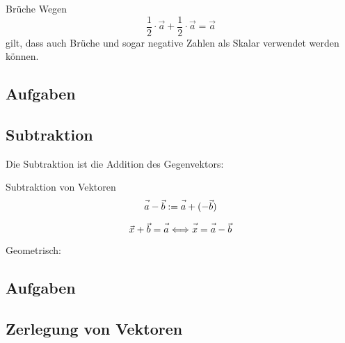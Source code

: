 \begin{beispiel}{Brüche}{}
  Wegen
  $$\frac12\cdot{}\vec{a} + \frac12\cdot{}\vec{a} = \vec{a}$$
  gilt, dass auch Brüche und sogar  negative Zahlen als Skalar
  verwendet werden können.
\end{beispiel}
\newpage

\subsection*{Aufgaben}
\newpage

\subsection{Subtraktion}

Die Subtraktion ist die Addition des Gegenvektors:

\begin{definition}{Subtraktion von Vektoren}{}
  $$\vec{a\vphantom{b}} - \vec{b} := \vec{a\vphantom{b}} + (-\vec{b})$$
\end{definition}

\begin{bemerkung}{}{}
  $$\vec{x\vphantom{x}} + \vec{b} = \vec{a\vphantom{b}} \Longleftrightarrow \vec{x\vphantom{b}} = \vec{a\vphantom{b}} - \vec{b}$$
\end{bemerkung}

Geometrisch:


\subsection*{Aufgaben}
\newpage


\subsection{Zerlegung von Vektoren}

